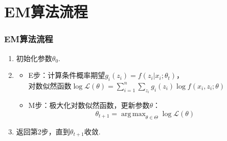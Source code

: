 \documentclass[UTF8]{ctexbeamer}
\DeclareMathOperator*{\argmax}{arg\,max}  %
\numberwithin{equation}{section}  %
\def\L{\mathcal{L}}         %
\begin{document}
\section{EM算法流程}
\begin{frame}
    \frametitle{EM算法流程}

    \begin{enumerate}
        \item<1-> 初始化参数$\theta_0$.
        \item<2-> \begin{itemize}
            \item E步：计算条件概率期望$g_i(z_i) = f(z_i|x_i;\theta_t)$，\\对数似然函数$\log\L(\theta) =\sum_{i=1}^n\sum_{z_i}g_i(z_i)\log f(x_i,z_i;\theta)$
            \item M步：极大化对数似然函数，更新参数$\theta$：
            \begin{equation*}
                \theta_{t+1} = \argmax_{\theta\in \Theta}\log\L(\theta)
            \end{equation*}
        \end{itemize}
        \item<3-> 返回第2步，直到$\theta_{t+1}$收敛.
    \end{enumerate}

\end{frame}
\end{document}
